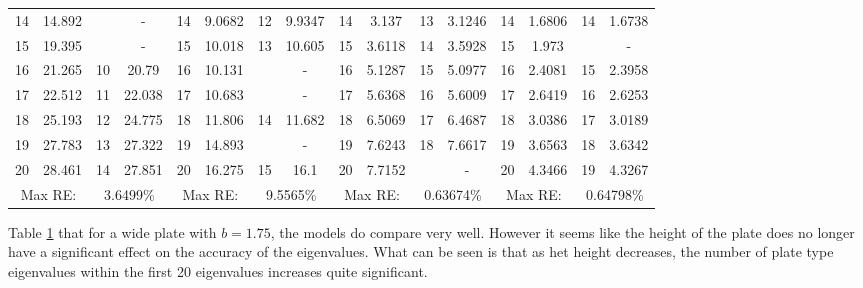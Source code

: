 \documentclass[../../main.tex]{subfiles}
\begin{document}
\begin{table}[htbp]
{{\begin{tabular}{|cccc||cccc||cccc||cccc|}
			14 & 14.892 &  & - & 14 & 9.0682 & 12 & 9.9347 & 14 & 3.137 & 13 & 3.1246 & 14 & 1.6806 & 14 & 1.6738\\
			15 & 19.395 &  & - & 15 & 10.018 & 13 & 10.605 & 15 & 3.6118 & 14 & 3.5928 & 15 & 1.973 &  & -\\
			16 & 21.265 & 10 & 20.79 & 16 & 10.131 &  & - & 16 & 5.1287 & 15 & 5.0977 & 16 & 2.4081 & 15 & 2.3958\\
			17 & 22.512 & 11 & 22.038 & 17 & 10.683 &  & - & 17 & 5.6368 & 16 & 5.6009 & 17 & 2.6419 & 16 & 2.6253\\
			18 & 25.193 & 12 & 24.775 & 18 & 11.806 & 14 & 11.682 & 18 & 6.5069 & 17 & 6.4687 & 18 & 3.0386 & 17 & 3.0189\\
			19 & 27.783 & 13 & 27.322 & 19 & 14.893 &  & - & 19 & 7.6243 & 18 & 7.6617 & 19 & 3.6563 & 18 & 3.6342\\
			20 & 28.461 & 14 & 27.851 & 20 & 16.275 & 15 & 16.1 & 20 & 7.7152 &  & - & 20 & 4.3466 & 19 & 4.3267\\
			\hline
			\multicolumn{2}{|c}{Max RE:} & \multicolumn{2}{c||}{3.6499\%} & \multicolumn{2}{c}{Max RE:} & \multicolumn{2}{c||}{9.5565\%} & \multicolumn{2}{c}{Max RE:} & \multicolumn{2}{c||}{0.63674\%} & \multicolumn{2}{c}{Max RE:} & \multicolumn{2}{c|}{0.64798\%} \\
			\hline
		\end{tabular}
		\label{tab:Table_plate_3}
	}}
\end{table}
\FloatBarrier

Table \ref{tab:Table_plate_3} that for a wide plate with $b=1.75$, the models do compare very well. However it seems like the height of the plate does no longer have a significant effect on the accuracy of the eigenvalues. What can be seen is that as het height decreases, the number of plate type eigenvalues within the first 20 eigenvalues increases quite significant.
\end{document}
